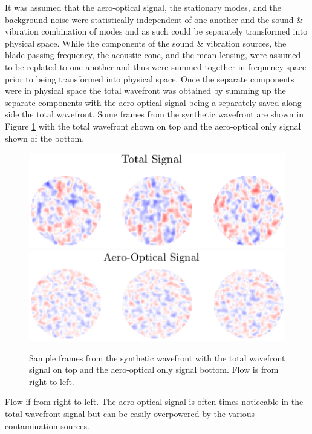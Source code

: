 It was assumed that the aero-optical signal, the stationary modes, and the background noise were statistically independent of one another and the sound \& vibration combination of modes and as such could be separately transformed into physical space.
While the components of the sound \& vibration sources, the blade-passing frequency, the acoustic cone, and the mean-lensing, were assumed to be replated to one another and thus were summed together in frequency space prior to being transformed into physical space.
Once the separate components were in physical space the total wavefront was obtained by summing up the separate components with the aero-optical signal being a separately saved along side the total wavefront.
Some frames from the synthetic wavefront are shown in Figure \ref{fig:04_synthetic_frames} with the total wavefront shown on top and the aero-optical only signal shown of the bottom.
\begin{figure}
  \centering
  \includegraphics{../matlab/04_basic_filtering/synthetic_frames_total.eps}
  \includegraphics{../matlab/04_basic_filtering/synthetic_frames_ao.eps}
  \caption{Sample frames from the synthetic wavefront with the total wavefront signal on top and the aero-optical only signal bottom.  Flow is from right to left.}
  \label{fig:04_synthetic_frames}
\end{figure}
Flow if from right to left.
The aero-optical signal is often times noticeable in the total wavefront signal but can be easily overpowered by the various contamination sources.

